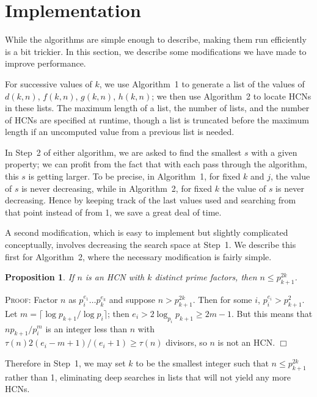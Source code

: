 \documentclass[12pt]{article}
\newtheorem{lemma}{Proposition}
\newenvironment{proof}{\textsc{Proof:}}{$\Box$ \medskip}
\begin{document}
\section{Implementation}

While the algorithms are simple enough to describe, making them run 
efficiently is a bit trickier. In this section, we describe some 
modifications we have made to improve performance.

For successive values of $k$, we use Algorithm~1 to generate a list 
of the values of $d(k,n)$, $f(k,n)$, $g(k,n)$, $h(k,n)$; we then use 
Algorithm~2 to locate HCNs in these lists. The maximum length of a 
list, the number of lists, and the number of HCNs are specified at 
runtime, though a list is truncated before the maximum length if an 
uncomputed value from a previous list is needed.

In Step~2 of either algorithm, we are asked to find the smallest $s$ 
with a given property; we can profit from the fact that with each pass 
through the algorithm, this $s$ is getting larger. To be precise, in 
Algorithm~1, for fixed $k$ and $j$, the value of $s$ is never 
decreasing, while in Algorithm~2, for fixed $k$ the value of $s$ is 
never decreasing. Hence by keeping track of the last values used and 
searching from that point instead of from 1, we save a great deal of 
time.

A second modification, which is easy to implement but slightly 
complicated conceptually, involves decreasing the search space at 
Step~1. We describe this first for Algorithm~2, where the necessary 
modification is fairly simple.
\begin{lemma}
If $n$ is an HCN with $k$ distinct prime factors, then $n \leq 
p_{k+1}^{2k}$.
\end{lemma}
\begin{proof}
Factor $n$ as $p_{i}^{e_{1}} \dots p_{k}^{e_{k}}$
and suppose $n > p_{k+1}^{2k}$. Then for some $i$, $p_{i}^{e_{i}} > 
p_{k+1}^{2}$. Let $m = \lceil \log p_{k+1}/\log p_{i}
\rceil$; then $e_i > 2 \log_{p_i} p_{k+1} \geq 2m - 1$. But this means 
that $n p_{k+1} / p_i^m$ is an integer less than $n$ with $\tau(n) 2(e_i 
- m + 1) / (e_i + 1) \geq \tau(n)$ divisors, so $n$ is not an HCN.
\end{proof}

Therefore in Step~1, we may set $k$ to be the 
smallest integer such that $n \leq p_{k+1}^{2k}$ rather than 1,
eliminating deep searches in lists that 
will not yield any more HCNs.
\end{document}
